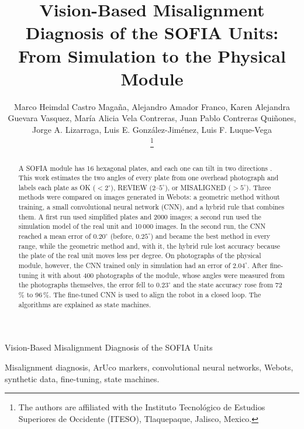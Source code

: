 \documentclass[lettersize,journal]{IEEEtran}
\begin{document}
	\title{Vision-Based Misalignment Diagnosis of the SOFIA Units: From Simulation to the Physical Module}

	\author{
		Marco Heimdal Castro Magaña, Alejandro Amador Franco, Karen Alejandra Guevara Vasquez, María Alicia Vela Contreras, Juan Pablo Contreras Quiñones,
		Jorge A. Lizarraga, Luis E. González-Jiménez, Luis F. Luque-Vega

		\thanks{The authors are affiliated with the Instituto Tecnológico de Estudios Superiores de Occidente (ITESO), Tlaquepaque, Jalisco, Mexico.}
	}

	{Vision-Based Misalignment Diagnosis of the SOFIA Units}

	\maketitle

	\begin{abstract}
		A SOFIA module has 16 hexagonal plates, and each one can tilt in two directions \cite{sofia_architecture}. This work estimates the two angles of every plate from one overhead photograph and labels each plate as OK ($<2^\circ$), REVIEW ($2$--$5^\circ$), or MISALIGNED ($>5^\circ$). Three methods were compared on images generated in Webots: a geometric method without training, a small convolutional neural network (CNN), and a hybrid rule that combines them. A first run used simplified plates and 2000 images; a second run used the simulation model of the real unit and 10\,000 images. In the second run, the CNN reached a mean error of $0.20^\circ$ (before, $0.25^\circ$) and became the best method in every range, while the geometric method and, with it, the hybrid rule lost accuracy because the plate of the real unit moves less per degree. On photographs of the physical module, however, the CNN trained only in simulation had an error of $2.04^\circ$. After fine-tuning it with about 400 photographs of the module, whose angles were measured from the photographs themselves, the error fell to $0.23^\circ$ and the state accuracy rose from 72\,\% to 96\,\%. The fine-tuned CNN is used to align the robot in a closed loop. The algorithms are explained as state machines.
	\end{abstract}

	\begin{IEEEkeywords}
		Misalignment diagnosis, ArUco markers, convolutional neural networks, Webots, synthetic data, fine-tuning, state machines.
	\end{IEEEkeywords}
\end{document}
